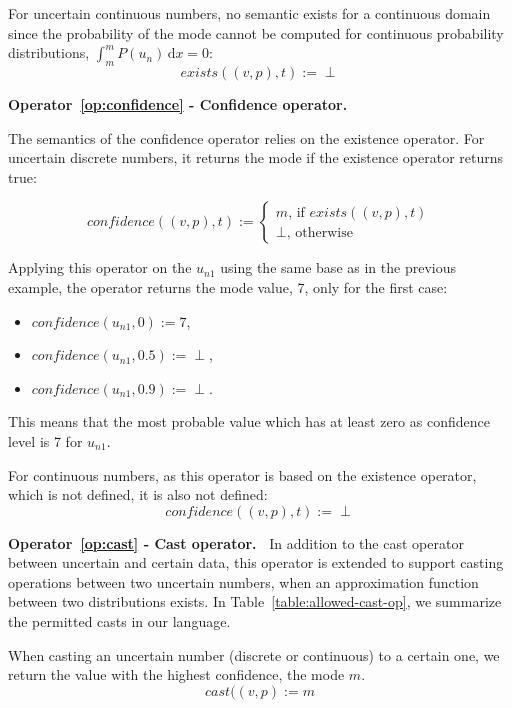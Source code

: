 For uncertain continuous numbers, no semantic exists for a continuous domain since the probability of the mode cannot be computed for continuous probability distributions, $\int_{m}^{m} P(u_n)\,\mathrm{d}x = 0$: 
\[exists((v, p), t) := \perp\]

\bigskip

\noindent\textbf{Operator~\ref{op:confidence} - Confidence operator.~}

The semantics of the confidence operator relies on the existence operator.
For uncertain discrete numbers, it returns the mode if the existence operator returns true:

\[confidence((v, p), t) :=  \begin{cases}
                                            m \text{, if } exists((v, p), t)\\
                                            \perp \text{, otherwise}
                                         \end{cases}\]
                                      
Applying this operator on the $u_{n1}$ using the same base as in the previous example, the operator returns the mode value, 7, only for the first case:
 \begin{itemize}
    \item $confidence(u_{n1}, 0) := 7$,
    \item $confidence(u_{n1}, 0.5) := \perp$,
    \item $confidence(u_{n1}, 0.9) := \perp$.
\end{itemize}

This means that the most probable value which has at least zero as confidence level is 7 for $u_{n1}$. 

For continuous numbers, as this operator is based on the existence operator, which is not defined, it is also not defined:
\[confidence((v, p), t) :=  \perp\]

\bigskip

\noindent\textbf{Operator~\ref{op:cast} - Cast operator.~}
In addition to the cast operator between uncertain and certain data, this operator is extended to support casting operations between two uncertain numbers, when an approximation function between two distributions exists.
In Table~\ref{table:allowed-cast-op}, we summarize the permitted casts in our language.

When casting an uncertain number (discrete or continuous) to a certain one, we return the value with the highest confidence, \ie the mode $m$.
\[cast((v, p) := m\]

